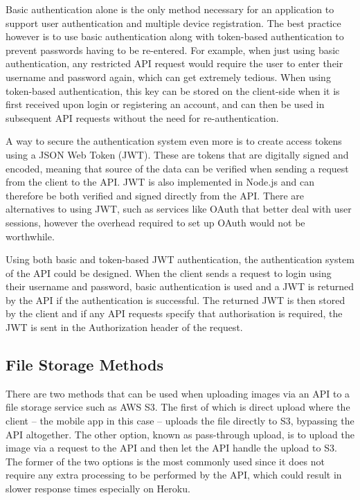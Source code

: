 Basic authentication alone is the only method necessary for an application to support user authentication and multiple device registration. The best practice however is to use basic authentication along with token-based authentication to prevent passwords having to be re-entered. For example, when just using basic authentication, any restricted API request would require the user to enter their username and password again, which can get extremely tedious. When using token-based authentication, this key can be stored on the client-side when it is first received upon login or registering an account, and can then be used in subsequent API requests without the need for re-authentication.

A way to secure the authentication system even more is to create access tokens using a JSON Web Token (JWT). These are tokens that are digitally signed and encoded, meaning that source of the data can be verified when sending a request from the client to the API. JWT is also implemented in Node.js and can therefore be both verified and signed directly from the API. There are alternatives to using JWT, such as services like OAuth that better deal with user sessions, however the overhead required to set up OAuth would not be worthwhile.

Using both basic and token-based JWT authentication, the authentication system of the API could be designed. When the client sends a request to login using their username and password, basic authentication is used and a JWT is returned by the API if the authentication is successful. The returned JWT is then stored by the client and if any API requests specify that authorisation is required, the JWT is sent in the Authorization header of the request.
 
\subsection{File Storage Methods} \label{subsection:file-storage-methods}

There are two methods that can be used when uploading images via an API to a file storage service such as AWS S3. The first of which is direct upload where the client -- the mobile app in this case -- uploads the file directly to S3, bypassing the API altogether. The other option, known as pass-through upload, is to upload the image via a request to the API and then let the API handle the upload to S3. The former of the two options is the most commonly used since it does not require any extra processing to be performed by the API, which could result in slower response times especially on Heroku.

